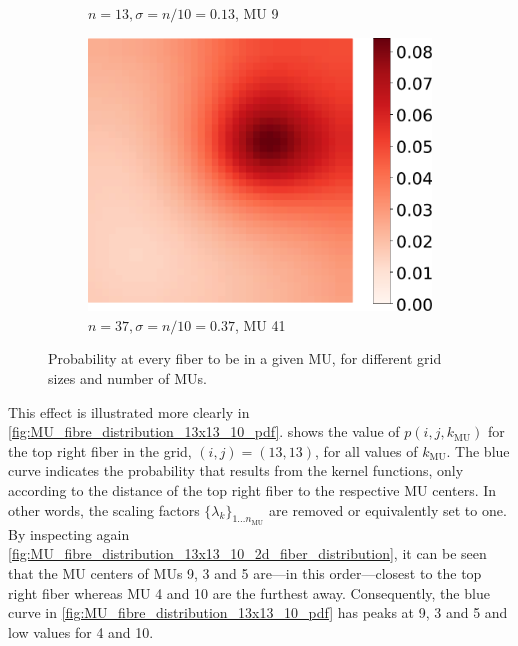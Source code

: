 \begin{figure}
\begin{subfigure}[t]{0.31\textwidth}
    \caption{$n=13, \sigma = n/10 = 0.13$, MU 9}%
    \label{fig:MU_fibre_distribution_13x13_10_fibers_mu9}%
  \end{subfigure}
  \quad
  \begin{subfigure}[t]{0.31\textwidth}%
    \centering%
    \includegraphics[width=\textwidth]{images/motor_unit_assignment/MU_fibre_distribution_37x37_50_fibers_mu41.pdf}%
    \caption{$n=37, \sigma = n/10 = 0.37$, MU 41}%
    \label{fig:MU_fibre_distribution_37x37_50_fibers_mu41}%
  \end{subfigure}
  \caption{Probability at every fiber to be in a given MU, for different grid sizes and number of MUs.}%
  \label{fig:mu_kernel_fkt}%
\end{figure}%

This effect is illustrated more clearly in \cref{fig:MU_fibre_distribution_13x13_10_pdf}.  shows the value of $p(i,j,k_\text{MU})$ for the top right fiber in the grid, $(i,j)=(13,13)$, for all values of $k_\text{MU}$. The blue curve indicates the probability that results from the kernel functions, only according to the distance of the top right fiber to the respective MU centers. In other words, the scaling factors $\{\lambda_k\}_{1\dots n_\text{MU}}$ are removed or equivalently set to one. By inspecting again \cref{fig:MU_fibre_distribution_13x13_10_2d_fiber_distribution}, it can be seen that the MU centers of MUs 9, 3 and 5 are---in this order---closest to the top right fiber whereas MU 4 and 10 are the furthest away. Consequently, the blue curve in \cref{fig:MU_fibre_distribution_13x13_10_pdf} has peaks at 9, 3 and 5 and low values for 4 and 10.

